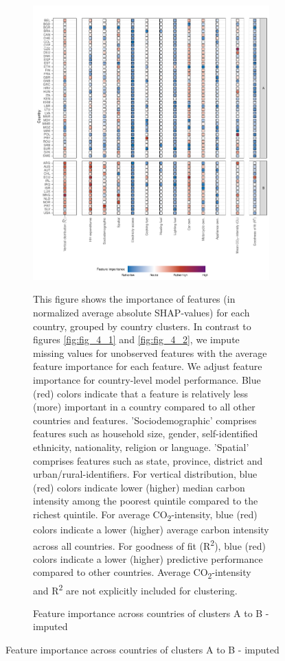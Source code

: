 \clearpage
\begin{figure}[ht!]\ContinuedFloat
    \centering
    \begin{subfigure}[b]{\textwidth}
    \centering
    \caption{Feature importance across countries of clusters A to B - imputed}\label{fig:fig_4_2_imputed}
    \includegraphics{Figure 4/Figure_4_Corrected_Imputed_1.pdf}
    \begin{subcaption2}
    This figure shows the importance of features (in normalized average absolute SHAP-values) for each country, grouped by country clusters. In contrast to figures \ref{fig:fig_4_1} and \ref{fig:fig_4_2}, we impute missing values for unobserved features with the average feature importance for each feature. We adjust feature importance for country-level model performance. Blue (red) colors indicate that a feature is relatively less (more) important in a country compared to all other countries and features. 'Sociodemographic' comprises features such as household size, gender, self-identified ethnicity, nationality, religion or language. 'Spatial' comprises features such as state, province, district and urban/rural-identifiers. For vertical distribution, blue (red) colors indicate lower (higher) median carbon intensity among the poorest quintile compared to the richest quintile. For average CO\textsubscript{2}-intensity, blue (red) colors indicate a lower (higher) average carbon intensity across all countries. For goodness of fit (R\textsuperscript{2}), blue (red) colors indicate a lower (higher) predictive performance compared to other countries. Average CO\textsubscript{2}-intensity and R\textsuperscript{2} are not explicitly included for clustering.

\end{subcaption2}
\end{subfigure}
\end{figure}
